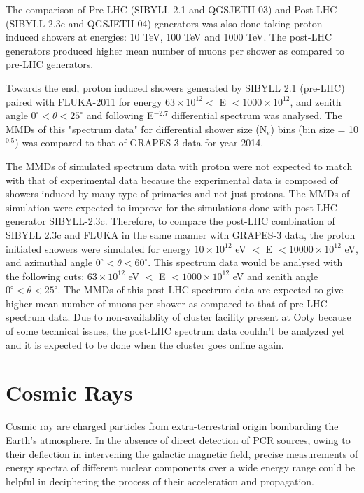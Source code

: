 \documentclass[12pt]{article}
\begin{document}
The comparison of Pre-LHC (SIBYLL 2.1 and QGSJETII-03) and Post-LHC (SIBYLL 2.3c and QGSJETII-04) generators was also done taking proton induced showers at energies: 10 TeV, 100 TeV and 1000 TeV. The post-LHC generators produced higher mean number of muons per shower as compared to pre-LHC generators.

Towards the end, proton induced showers generated by SIBYLL 2.1 (pre-LHC) paired with FLUKA-2011 for energy $63\times10^{12} < $ E $<1000\times10^{12}$, and zenith angle $0^\circ<\theta<25^\circ$ and following E$^{-2.7}$ differential spectrum was analysed. The MMDs of this "spectrum data" for differential shower size (N$_e$) bins (bin size = 10$^{0.5}$) was compared to that of GRAPES-3 data for year 2014.  

The MMDs of simulated spectrum data with proton were not expected to match with
that of experimental data because the experimental data is composed of showers
induced by many type of primaries and not just protons. The MMDs of simulation
were expected to improve for the simulations done with post-LHC generator
SIBYLL-2.3c. Therefore, to compare the post-LHC combination of SIBYLL 2.3c and
FLUKA in the same manner with GRAPES-3 data, the proton initiated showers were
simulated for energy $10\times10^{12}$ eV $<$  E $<10000\times10^{12}$ eV, and
azimuthal angle $0^\circ<\theta<60^\circ$. This spectrum data would be analysed
with the following cuts: $63\times10^{12}$ eV $<$  E $<1000\times10^{12}$ eV
and zenith angle $0^\circ<\theta<25^\circ$. The MMDs of this post-LHC
spectrum data are expected to give higher mean number of muons per shower as
compared to that of pre-LHC spectrum data. Due to non-availablity of cluster
facility present at Ooty because of some technical issues, the post-LHC
spectrum data couldn't be analyzed yet and it is expected to be done when the
cluster goes online again. 

 
\section{Cosmic Rays}

Cosmic ray are charged particles from extra-terrestrial origin bombarding the
Earth's atmosphere. In the absence of direct detection of PCR sources, owing to
their deflection in intervening the galactic magnetic field, precise
measurements of energy spectra of different nuclear components over a wide
energy range could be helpful in deciphering the process of their acceleration
and propagation. 
\end{document}
